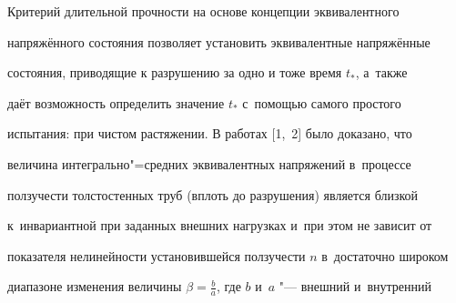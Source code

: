 


\date{12.12.2007} 



\address{\samgtu}




\email{}



\renewcommand{\baselinestretch}{.95}

\maketitle







Критерий длительной прочности на основе концепции эквивалентного 

напряжённого состояния позволяет установить эквивалентные напряжённые 

состояния, приводящие к разрушению за одно и тоже время $t_*$, а~также 

даёт возможность определить значение $t_*$ с~помощью самого простого 

испытания: при чистом растяжении. В работах [1,~2] было доказано, что 

величина интегрально"=средних эквивалентных напряжений в~процессе 

ползучести толстостенных труб (вплоть до разрушения) является близкой 

к~инвариантной при заданных внешних нагрузках и~при этом не зависит от 

показателя нелинейности установившейся ползучести $n$ в~достаточно широком 

диапазоне изменения величины $\beta = \frac ba$, где $b$ и~$a$ "--- внешний и~внутренний 

